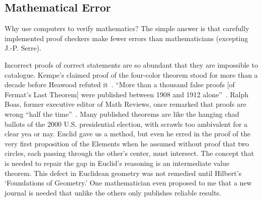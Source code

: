 \documentclass{llncs}
\begin{document}
 


\subsection{Mathematical Error}

Why use computers to verify mathematics?  The simple answer is that
carefully implemented proof checkers make fewer errors than 
mathematicians (excepting J.-P. Serre).

Incorrect proofs of correct statements are so abundant that they are
impossible to catalogue.  Kempe's claimed proof of the four-color
theorem stood for more than a decade before Heawood refuted
it~\cite[p.~115]{Mac}.  ``More than a thousand false proofs [of
Fermat's Last Theorem] were published between 1908 and 1912
alone''~\cite{Corry}.  Ralph Boas, former executive editor of Math
Reviews, once remarked that proofs are wrong ``half the
time''~\cite{Aus}.  Many published theorems are like the hanging chad
ballots of the 2000 U.S. presidential election, with scrawls too
ambivalent for a clear yea or nay.  Euclid gave us a method, but even
he erred in the proof of the very first proposition of the Elements
when he assumed without proof that two circles, each passing through
the other's center, must intersect.  The concept that is needed to
repair the gap in Euclid's reasoning is an intermediate value theorem.
This defect in Euclidean geometry was not remedied until Hilbert's
`Foundations of Geometry.'  One mathematician even proposed to me that a
new journal is needed that unlike the others %
only publishes reliable results.

\end{document}

